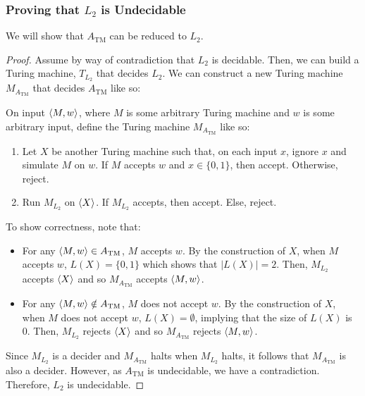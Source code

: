 \documentclass[letterpaper]{article}
\begin{document}
\subsubsection{Proving that \texorpdfstring{$L_2$}{} is Undecidable}
We will show that $A_{\text{TM}}$ can be reduced to $L_2$. 
\begin{mdframed}[]
    \begin{proof}
        Assume by way of contradiction that $L_2$ is decidable. Then, we can build a Turing machine, $T_{L_2}$ that decides $L_2$. We can construct a new Turing machine $M_{A_{\text{TM}}}$ that decides $A_{\text{TM}}$ like so:
        \begin{mdframed}[]
            On input $\langle M, w \rangle$, where $M$ is some arbitrary Turing machine and $w$ is some arbitrary input, define the Turing machine $M_{A_{\text{TM}}}$ like so: 
            \begin{enumerate}
                \item Let $X$ be another Turing machine such that, on each input $x$, ignore $x$ and simulate $M$ on $w$. If $M$ accepts $w$ and $x \in \{0, 1\}$, then accept. Otherwise, reject. 
                \item Run $M_{L_2}$ on $\langle X \rangle$. If $M_{L_2}$ accepts, then accept. Else, reject.
            \end{enumerate}
        \end{mdframed}
        To show correctness, note that: 
        \begin{itemize}
            \item For any $\langle M, w \rangle \in A_{\text{TM}}$, $M$ accepts $w$. By the construction of $X$, when $M$ accepts $w$, $L(X) = \{0, 1\}$ which shows that $|L(X)| = 2$. Then, $M_{L_2}$ accepts $\langle X \rangle$ and so $M_{A_{\text{TM}}}$ accepts $\langle M, w \rangle$. 
            \item For any $\langle M, w \rangle \notin A_{\text{TM}}$, $M$ does not accept $w$. By the construction of $X$, when $M$ does not accept $w$, $L(X) = \emptyset$, implying that the size of $L(X)$ is 0. Then, $M_{L_2}$ rejects $\langle X \rangle$ and so $M_{A_{\text{TM}}}$ rejects $\langle M, w \rangle$. 
        \end{itemize}
        Since $M_{L_2}$ is a decider and $M_{A_{\text{TM}}}$ halts when $M_{L_2}$ halts, it follows that $M_{A_{\text{TM}}}$ is also a decider. However, as $A_{\text{TM}}$ is undecidable, we have a contradiction. Therefore, $L_2$ is undecidable. 
    \end{proof}
\end{mdframed}
\end{document}
